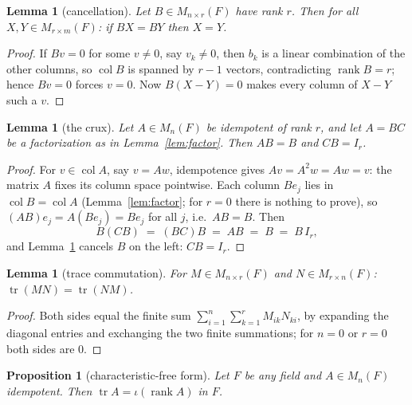 \documentclass[11pt]{article}
\newtheorem{proposition}[theorem]{Proposition}
\newtheorem{lemma}[theorem]{Lemma}
\begin{document}
\begin{lemma}[cancellation]\label{lem:cancel}
Let $B \in M_{n\times r}(F)$ have rank $r$. Then for all
$X, Y \in M_{r\times m}(F)$: if $BX = BY$ then $X = Y$.
\end{lemma}

\begin{proof}
If $Bv = 0$ for some $v \ne 0$, say $v_k \ne 0$, then $b_k$ is a linear combination
of the other columns, so $\operatorname{col} B$ is spanned by $r-1$ vectors,
contradicting $\operatorname{rank} B = r$; hence $Bv = 0$ forces $v = 0$. Now
$B(X - Y) = 0$ makes every column of $X - Y$ such a $v$.
\end{proof}

\begin{lemma}[the crux]\label{lem:cb}
Let $A \in M_n(F)$ be idempotent of rank $r$, and let $A = BC$ be a factorization as
in Lemma~\ref{lem:factor}. Then $AB = B$ and $CB = I_r$.
\end{lemma}

\begin{proof}
For $v \in \operatorname{col} A$, say $v = Aw$, idempotence gives
$Av = A^2w = Aw = v$: the matrix $A$ fixes its column space pointwise. Each column
$Be_j$ lies in $\operatorname{col} B = \operatorname{col} A$
(Lemma~\ref{lem:factor}; for $r=0$ there is nothing to prove), so
$(AB)e_j = A(Be_j) = Be_j$ for all $j$, i.e.\ $AB = B$. Then
\[
  B(CB) \;=\; (BC)B \;=\; AB \;=\; B \;=\; B\,I_r,
\]
and Lemma~\ref{lem:cancel} cancels $B$ on the left: $CB = I_r$.
\end{proof}

\begin{lemma}[trace commutation]\label{lem:trace}
For $M \in M_{n\times r}(F)$ and $N \in M_{r\times n}(F)$:
$\operatorname{tr}(MN) = \operatorname{tr}(NM)$.
\end{lemma}

\begin{proof}
Both sides equal the finite sum $\sum_{i=1}^{n}\sum_{k=1}^{r} M_{ik}N_{ki}$, by
expanding the diagonal entries and exchanging the two finite summations; for $n = 0$
or $r = 0$ both sides are $0$.
\end{proof}

\begin{proposition}[characteristic-free form]\label{prop:field}
Let $F$ be any field and $A \in M_n(F)$ idempotent. Then
$\operatorname{tr} A = \iota(\operatorname{rank} A)$ in $F$.
\end{proposition}
\end{document}
